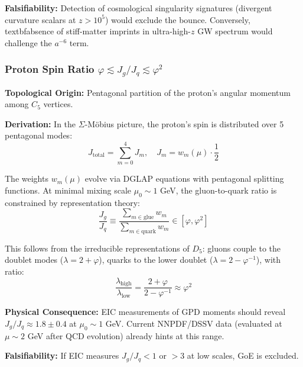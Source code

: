 \documentclass[12pt]{article}
\begin{document}
\textbf{Falsifiability:} Detection of cosmological singularity signatures (divergent curvature scalars at $z > 10^5$) would exclude the bounce. Conversely, \\textbf{absence} of stiff-matter imprints in ultra-high-$z$ GW spectrum would challenge the $a^{-6}$ term.

\subsubsection{Proton Spin Ratio $\varphi \lesssim J_g/J_q \lesssim \varphi^2$}

\textbf{Topological Origin:} Pentagonal partition of the proton's angular momentum among $C_5$ vertices.

\textbf{Derivation:} In the $\Sigma$-M\"obius picture, the proton's spin is distributed over 5 pentagonal modes:
\begin{equation}
J_{\text{total}} = \sum_{m=0}^4 J_m, \quad J_m = w_m(\mu) \cdot \frac{1}{2}
\end{equation}

The weights $w_m(\mu)$ evolve via DGLAP equations with pentagonal splitting functions. At minimal mixing scale $\mu_0 \sim 1$ GeV, the gluon-to-quark ratio is constrained by representation theory:
\begin{equation}
\frac{J_g}{J_q} \equiv \frac{\sum_{m \in \text{glue}} w_m}{\sum_{m \in \text{quark}} w_m} \in \left[\varphi, \varphi^2\right]
\end{equation}

This follows from the irreducible representations of $D_5$: gluons couple to the doublet modes ($\lambda = 2 + \varphi$), quarks to the lower doublet ($\lambda = 2 - \varphi^{-1}$), with ratio:
\begin{equation}
\frac{\lambda_{\text{high}}}{\lambda_{\text{low}}} = \frac{2 + \varphi}{2 - \varphi^{-1}} \approx \varphi^2
\end{equation}

\textbf{Physical Consequence:} EIC measurements of GPD moments should reveal $J_g/J_q \approx 1.8 \pm 0.4$ at $\mu_0 \sim 1$ GeV. Current NNPDF/DSSV data (evaluated at $\mu \sim 2$ GeV after QCD evolution) already hints at this range.

\textbf{Falsifiability:} If EIC measures $J_g/J_q < 1$ or $> 3$ at low scales, GoE is excluded.


\end{document}
